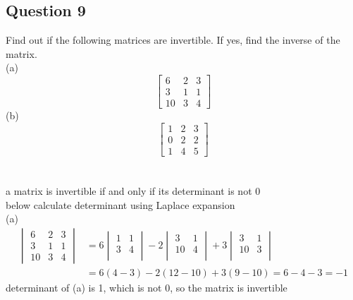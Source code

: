 \documentclass[12pt, border = 4pt, multi]{article} %
\begin{document}
\subsection*{Question 9}
Find out if the following matrices are invertible. If yes, find the inverse of the matrix.\\
(a)
\begin{equation}
    \left[ 
        \begin{array}{ccc}
         6 & 2 & 3 \\ 
         3 & 1 & 1 \\
        10 & 3 & 4 
        \end{array} 
    \right]
\end{equation}
(b)
\begin{equation}
    \left[ 
        \begin{array}{ccc}
         1 & 2 & 3 \\ 
         0 & 2 & 2 \\
         1 & 4 & 5 
        \end{array} 
    \right]
\end{equation}\\
\\
a matrix is invertible if and only if its determinant is not 0\\
below calculate determinant using Laplace expansion\\
(a)
\begin{align*}
\begin{vmatrix}
6 & 2 & 3\\ 
3 & 1 & 1\\
10 & 3 & 4 
\end{vmatrix}
&=
6
\begin{vmatrix}
1 & 1\\
3 & 4\\
\end{vmatrix}
- 2
\begin{vmatrix}
3 & 1\\
10 & 4\\
\end{vmatrix}
+ 3
\begin{vmatrix}
3 & 1\\
10 & 3\\
\end{vmatrix}\\
&= 6(4 - 3) - 2(12 - 10) + 3(9 - 10) = 6 - 4 - 3 = -1
\end{align*}
determinant of (a) is 1, which is not 0, so the matrix is invertible
\end{document}
